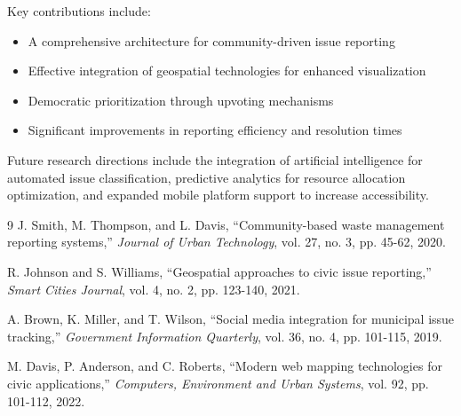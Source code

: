 \documentclass[journal,10pt,twocolumn]{IEEEtran}
\begin{document}
Key contributions include:

\begin{itemize}
\item A comprehensive architecture for community-driven issue reporting
\item Effective integration of geospatial technologies for enhanced visualization
\item Democratic prioritization through upvoting mechanisms
\item Significant improvements in reporting efficiency and resolution times
\end{itemize}

Future research directions include the integration of artificial intelligence for automated issue classification, predictive analytics for resource allocation optimization, and expanded mobile platform support to increase accessibility.

\begin{thebibliography}{9}
J. Smith, M. Thompson, and L. Davis, ``Community-based waste management reporting systems,'' \emph{Journal of Urban Technology}, vol. 27, no. 3, pp. 45-62, 2020.

R. Johnson and S. Williams, ``Geospatial approaches to civic issue reporting,'' \emph{Smart Cities Journal}, vol. 4, no. 2, pp. 123-140, 2021.

A. Brown, K. Miller, and T. Wilson, ``Social media integration for municipal issue tracking,'' \emph{Government Information Quarterly}, vol. 36, no. 4, pp. 101-115, 2019.

M. Davis, P. Anderson, and C. Roberts, ``Modern web mapping technologies for civic applications,'' \emph{Computers, Environment and Urban Systems}, vol. 92, pp. 101-112, 2022.
\end{thebibliography}
\end{document}
